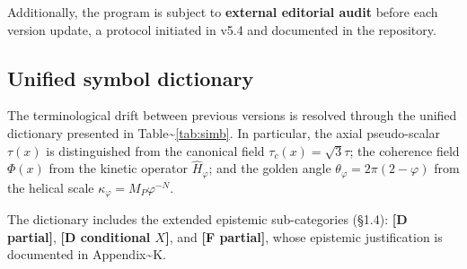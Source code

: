 ﻿\documentclass[11pt,letterpaper]{article}
\begin{document}
Additionally, the program is subject to \textbf{external editorial audit} before each version update, a protocol initiated in v5.4 and documented in the repository.
\subsection{Unified symbol dictionary}
The terminological drift between previous versions is resolved through the unified dictionary presented in Table\textasciitilde{}\ref{tab:simb}. In particular, the axial pseudo-scalar $\tau(x)$ is distinguished from the canonical field $\tau_c(x) = \sqrt{3}\tau$; the coherence field $\Phi(x)$ from the kinetic operator $\hat{H}_\varphi$; and the golden angle $\theta_\varphi = 2\pi(2-\varphi)$ from the helical scale $\kappa_\varphi = M_P \varphi^{-N}$.

The dictionary includes the extended epistemic sub-categories (§1.4): \textbf{[D partial]}, \textbf{[D conditional $X$]}, and \textbf{[F partial]}, whose epistemic justification is documented in Appendix\textasciitilde{}K.

\begin{table}[htbp]
  \centering
  \small
  \caption{Unified symbol dictionary (thesis v5.4).}
  \label{tab:simb}
\end{table}
\end{document}
